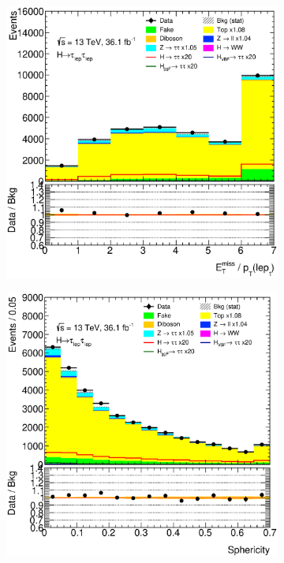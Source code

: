 \begin{figure}[htb]
\begin{subfigure}[t]{0.3\textwidth}
    \end{subfigure}
    \begin{subfigure}[t]{0.3\textwidth}
        \includegraphics[width=\textwidth]{./plots/mva/modeling/input_vars/BOOST_CR/ll-CutMVABoostedCatTopCR-RatioMETPtL1-lin.eps}
    \end{subfigure}
    \begin{subfigure}[t]{0.3\textwidth}
        \includegraphics[width=\textwidth]{./plots/mva/modeling/input_vars/BOOST_CR/ll-CutMVABoostedCatTopCR-Sphericity-lin.eps}

\end{subfigure}
\end{figure}
